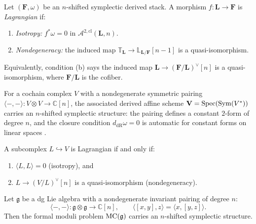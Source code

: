 \begin{definition}
\label{def:thqg-III-ptvv-lagrangian}
Let $(\mathbf{F}, \omega)$ be an $n$-shifted symplectic derived
stack. A morphism $f \colon \mathbf{L} \to \mathbf{F}$ is
\emph{Lagrangian} if:
\begin{enumerate}[label=\textup{(\alph*)}]
\item \emph{Isotropy:} $f^* \omega = 0$ in
 $\mathcal{A}^{2,\mathrm{cl}}(\mathbf{L}, n)$.
\item \emph{Nondegeneracy:} the induced map
 $\mathbb{T}_{\mathbf{L}} \to
 \mathbb{L}_{\mathbf{L}/\mathbf{F}}[n-1]$
 is a quasi-isomorphism.
\end{enumerate}
Equivalently, condition (b) says the induced map
$\mathbf{L} \to (\mathbf{F}/\mathbf{L})^{\vee}[n]$ is a
quasi-isomorphism, where $\mathbf{F}/\mathbf{L}$ is the
cofiber.
\end{definition}

\begin{example}
\label{ex:thqg-III-linear-shifted}
For a cochain complex $V$ with a nondegenerate symmetric pairing
$\langle -, - \rangle \colon V \otimes V \to \mathbb{C}[n]$,
the associated derived affine scheme
$\mathbf{V} = \operatorname{Spec}(\operatorname{Sym}(V^*))$ carries an $n$-shifted
symplectic structure: the pairing defines a constant $2$-form
of degree $n$, and the closure condition
$d_{\mathrm{dR}}\omega = 0$ is automatic for constant forms
on linear spaces \cite[Example~1.4]{PTVV13}.

A subcomplex $L \hookrightarrow V$ is Lagrangian if and only
if:
\begin{enumerate}[label=\textup{(\alph*)}]
\item $\langle L, L \rangle = 0$ (isotropy), and
\item $L \to (V/L)^{\vee}[n]$ is a quasi-isomorphism
 (nondegeneracy).
\end{enumerate}
\end{example}

\begin{proposition}
\label{prop:thqg-III-kontsevich-pridham}
Let $\mathfrak{g}$ be a dg Lie algebra with a nondegenerate
invariant pairing of degree $n$:
\[
\langle -, - \rangle
\colon \mathfrak{g} \otimes \mathfrak{g}
\to \mathbb{C}[n],
\qquad
\langle [x,y], z \rangle
= \langle x, [y,z] \rangle.
\]
Then the formal moduli problem
$\mathrm{MC}(\mathfrak{g})$ carries an $n$-shifted symplectic structure.
\end{proposition}

